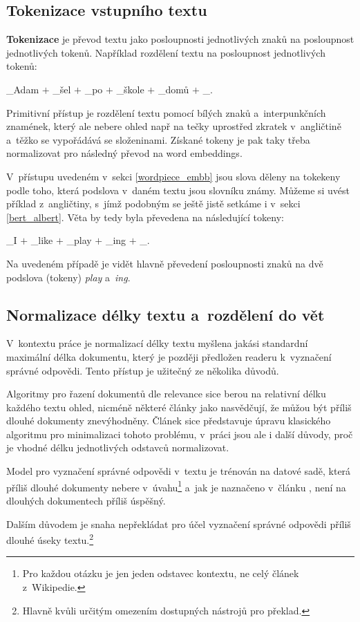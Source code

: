 \subsection{Tokenizace vstupního textu}
\textbf{Tokenizace} je převod textu jako posloupnosti jednotlivých znaků na posloupnost jednotlivých tokenů. Například rozdělení textu  na posloupnost jednotlivých tokenů:
\begin{center}
    \_Adam $+$ \_šel $+$ \_po $+$ \_škole $+$ \_domů $+$ \_.
\end{center}
Primitivní přístup je rozdělení textu pomocí bílých znaků a~interpunkčních znamének, který ale nebere ohled např na tečky uprostřed zkratek v~angličtině a~těžko se vypořádává se složeninami. Získané tokeny je pak taky třeba normalizovat pro následný převod na word embeddings.\par
V~přístupu uvedeném v~sekci \ref{wordpiece_embb} jsou slova děleny na tokekeny podle toho, která podslova v~daném textu jsou slovníku známy. Můžeme si uvést příklad z~angličtiny, s~jímž podobným se ještě jistě setkáme i v~sekci \ref{bert_albert}. Věta  by tedy byla převedena na následující tokeny:
\begin{center}
    \_I $+$ \_like $+$ \_play $+$ \_ing $+$ \_.
\end{center}
Na uvedeném případě je vidět hlavně převedení posloupnosti znaků  na dvě podslova (tokeny) \emph{play} a~\emph{ing}.

\subsection{Normalizace délky textu a~rozdělení do vět}
V~kontextu práce je normalizací délky textu myšlena jakási standardní maximální délka dokumentu, který je později předložen readeru k~vyznačení správné odpovědi. Tento přístup je užitečný ze několika důvodů.\par
Algoritmy pro řazení dokumentů dle relevance sice berou na relativní délku každého textu ohled, nicméně některé články jako \cite{bm25_too_long} nasvědčují, že můžou být příliš dlouhé dokumenty znevýhodněny. Článek \cite{bm25_too_long} sice představuje úpravu klasického algoritmu pro minimalizaci tohoto problému, v~práci jsou ale i další důvody, proč je vhodné délku jednotlivých odstavců normalizovat.\par
Model pro vyznačení správné odpovědi v~textu je trénován na datové sadě, která příliš dlouhé dokumenty nebere v~úvahu\footnote{Pro každou otázku je jen jeden odstavec kontextu, ne celý článek z~Wikipedie.} a~jak je naznačeno v~článku \cite{QA_long_multiple_span}, není na dlouhých dokumentech příliš úspěšný.\par
Dalším důvodem je snaha nepřekládat pro účel vyznačení správné odpovědi příliš dlouhé úseky textu.\footnote{Hlavně kvůli určitým omezením dostupných nástrojů pro překlad.}

